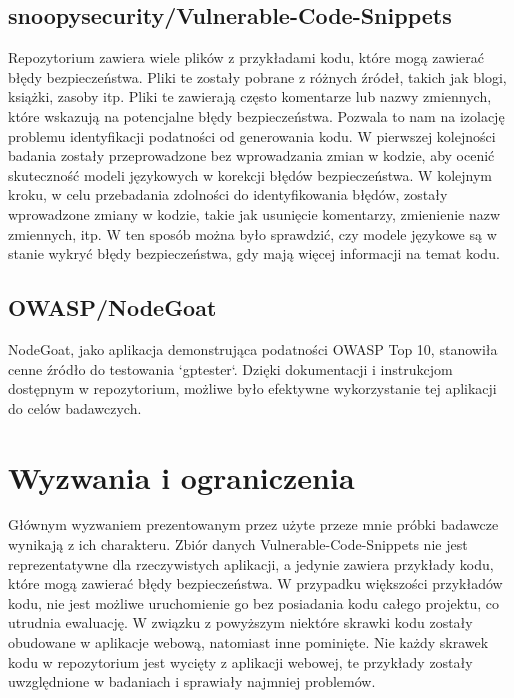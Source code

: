 \subsection{snoopysecurity/Vulnerable-Code-Snippets} 
Repozytorium zawiera wiele plików z przykładami kodu, które mogą zawierać błędy bezpieczeństwa. Pliki te zostały pobrane z różnych źródeł, takich jak blogi, książki, zasoby itp. Pliki te zawierają często komentarze lub nazwy zmiennych, które wskazują na potencjalne błędy bezpieczeństwa. Pozwala to nam na izolację problemu identyfikacji podatności od generowania kodu. W pierwszej kolejności badania zostały przeprowadzone bez wprowadzania zmian w kodzie, aby ocenić skuteczność modeli językowych w korekcji błędów bezpieczeństwa. W kolejnym kroku, w celu przebadania zdolności do identyfikowania błędów, zostały wprowadzone zmiany w kodzie, takie jak usunięcie komentarzy, zmienienie nazw zmiennych, itp. W ten sposób można było sprawdzić, czy modele językowe są w stanie wykryć błędy bezpieczeństwa, gdy mają więcej informacji na temat kodu.



\subsection{OWASP/NodeGoat}
NodeGoat, jako aplikacja demonstrująca podatności OWASP Top 10, stanowiła cenne źródło do testowania `gptester`. Dzięki dokumentacji i instrukcjom dostępnym w repozytorium, możliwe było efektywne wykorzystanie tej aplikacji do celów badawczych.

\section{Wyzwania i ograniczenia}
\label{sec:wyzwania_i_ograniczenia}

Głównym wyzwaniem prezentowanym przez użyte przeze mnie próbki badawcze wynikają z ich charakteru. Zbiór danych Vulnerable-Code-Snippets nie jest reprezentatywne dla rzeczywistych aplikacji, a jedynie zawiera przykłady kodu, które mogą zawierać błędy bezpieczeństwa. W przypadku większości przykładów kodu, nie jest możliwe uruchomienie go bez posiadania kodu całego projektu, co utrudnia ewaluację. W związku z powyższym niektóre skrawki kodu zostały obudowane w aplikacje webową, natomiast inne pominięte. Nie każdy skrawek kodu w repozytorium jest wycięty z aplikacji webowej, te przykłady zostały uwzględnione w badaniach i sprawiały najmniej problemów. 

